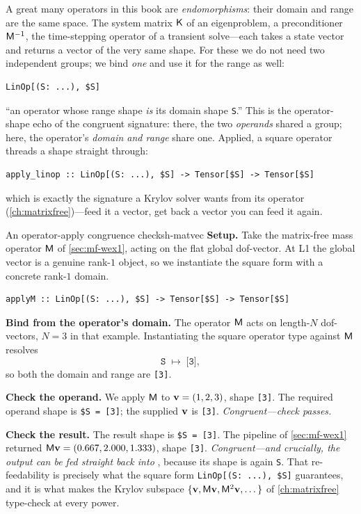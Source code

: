 A great many operators in this book are \emph{endomorphisms}: their domain and
range are the same space. The system matrix $\mathsf{K}$ of an eigenproblem, a
preconditioner $\mathsf{M}^{-1}$, the time-stepping operator of a transient
solve---each takes a state vector and returns a vector of the very same shape.
For these we do not need two independent groups; we bind \emph{one} and use it
for the range as well:
\begin{lstlisting}[style=l4style]
LinOp[(S: ...), $S]
\end{lstlisting}
``an operator whose range shape \emph{is} its domain shape \texttt{S}.'' This
is the operator-shape echo of the congruent  signature: there, the
two \emph{operands} shared a group; here, the operator's \emph{domain and
range} share one. Applied, a square operator threads a shape straight through:
\begin{lstlisting}[style=l4style]
apply_linop :: LinOp[(S: ...), $S] -> Tensor[$S] -> Tensor[$S]
\end{lstlisting}
which is exactly the signature a Krylov solver wants from its operator
(\cref{ch:matrixfree})---feed it a vector, get back a vector you can feed it
again.

\begin{workedexample}{An operator-apply congruence check}{sh-matvec}
\textbf{Setup.} Take the matrix-free mass operator $\mathsf{M}$ of
\cref{sec:mf-wex1}, acting on the flat global dof-vector. At L1 the global
vector is a genuine rank-$1$ object, so we instantiate the square form with a
concrete rank-$1$ domain.
\begin{lstlisting}[style=l4style]
applyM :: LinOp[(S: ...), $S] -> Tensor[$S] -> Tensor[$S]
\end{lstlisting}

\tcblower
\textbf{Bind from the operator's domain.} The operator $\mathsf{M}$ acts on
length-$N$ dof-vectors, $N=3$ in that example. Instantiating the square
operator type against $\mathsf{M}$ resolves
\[
  \texttt{S} \;\mapsto\; \texttt{[3]} ,
\]
so both the domain and range are \lstinline[style=l4style]|[3]|.

\textbf{Check the operand.} We apply $\mathsf{M}$ to $\mathbf{v}=(1,2,3)$, shape
\lstinline[style=l4style]|[3]|. The required operand shape is
\lstinline[style=l4style]|$S = [3]|; the supplied $\mathbf{v}$ is
\lstinline[style=l4style]|[3]|. \emph{Congruent---check passes.}

\textbf{Check the result.} The result shape is \lstinline[style=l4style]|$S = [3]|.
The pipeline of \cref{sec:mf-wex1} returned $\mathsf{M}\mathbf{v} = (0.667, 2.000, 1.333)$,
shape \lstinline[style=l4style]|[3]|. \emph{Congruent---and crucially, the
output can be fed straight back into }, because its shape is again
\texttt{S}. That re-feedability is precisely what the square form
\lstinline[style=l4style]|LinOp[(S: ...), $S]| guarantees, and it is what makes
the Krylov subspace $\{\mathbf{v}, \mathsf{M}\mathbf{v}, \mathsf{M}^2\mathbf{v}, \dots\}$ of
\cref{ch:matrixfree} type-check at every power.
\end{workedexample}

